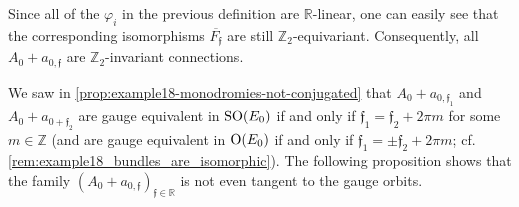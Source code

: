 \documentclass[11pt,a4paper]{scrartcl}
\newcommand{\SO}{\textup{SO}}
\renewcommand{\O}{\textup{O}}
\numberwithin{equation}{section}
\theoremstyle{plain}
\theoremstyle{definition}
\theoremstyle{remark}
\begin{document}
\begin{remark}\label{rem:example18-flat_family_is_Z_2-invariant}
Since all of the $\varphi_i$ in the previous definition are $\mathbb{R}$-linear, one can easily see that the corresponding isomorphisms $\overline{F_\mathfrak{f}}$ are still $\mathbb{Z}_2$-equivariant. Consequently, all $A_0 +a_{0,\mathfrak{f}}$ are $\mathbb{Z}_2$-invariant connections.
\end{remark}

We saw in \autoref{prop:example18-monodromies-not-conjugated} that $A_0+a_{0,\mathfrak{f}_1}$ and $A_0 + a_{0+\mathfrak{f}_2}$ are gauge equivalent in $\SO(E_0)$ if and only if $\mathfrak{f}_1 = \mathfrak{f}_2 +2\pi m$ for some $m\in \mathbb{Z}$ (and are gauge equivalent in $\O(E_0)$ if and only if $\mathfrak{f}_1 = \pm \mathfrak{f}_2 +2\pi m$; cf. \autoref{rem:example18_bundles_are_isomorphic}). The following proposition shows that the family $(A_0+a_{0,\mathfrak{f}})_{\mathfrak{f}\in \mathbb{R}}$ is not even tangent to the gauge orbits.
\end{document}
